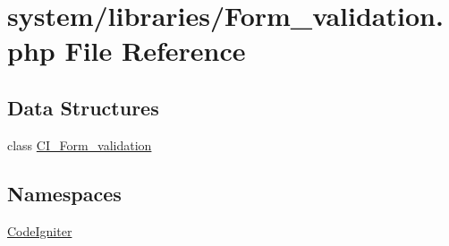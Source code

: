\hypertarget{_form__validation_8php}{}\section{system/libraries/\+Form\+\_\+validation.php File Reference}
\label{_form__validation_8php}
\subsection*{Data Structures}
\begin{DoxyCompactItemize}
\item 
class \mbox{\hyperlink{class_c_i___form__validation}{C\+I\+\_\+\+Form\+\_\+validation}}
\end{DoxyCompactItemize}
\subsection*{Namespaces}
\begin{DoxyCompactItemize}
\item 
 \mbox{\hyperlink{namespace_code_igniter}{Code\+Igniter}}
\end{DoxyCompactItemize}
